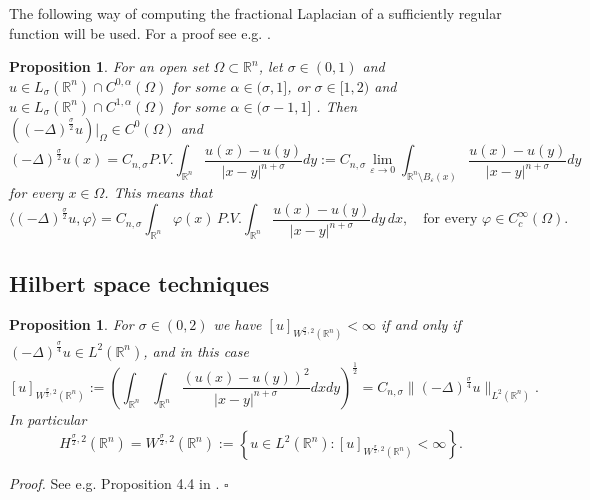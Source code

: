 \documentclass[11pt, a4paper]{article}
\newtheorem{prop}[trm]{Proposition}
\newcommand{\R}{\mathbb{R}}
\newcommand{\ve}{\varepsilon}
\newenvironment{proof}{\noindent\emph{Proof.}}{\phantom{ } \hfill$\square$\medskip}
\begin{document}


The following way of computing the fractional Laplacian of a sufficiently regular function will be used. For a proof see e.g. \cite[Prop. 2.4]{Sil}.


\begin{prop}\label{lapint} For an open set $\Omega\subset\R^n$, let $\sigma\in (0,1)$ and $u\in L_\sigma(\R^n)\cap C^{0,\alpha}(\Omega)$ for some $\alpha\in  (\sigma,1]$, or $\sigma\in [1,2)$ and $u\in L_\sigma(\R^n)\cap C^{1,\alpha}(\Omega)$ for some $\alpha\in  (\sigma-1,1]$ . Then $((-\Delta)^\frac{\sigma}{2} u)|_\Omega\in C^0(\Omega)$ and
$$(-\Delta)^\frac{\sigma}{2} u(x)=C_{n,\sigma} P.V.\int_{\R^n} \frac{u(x)-u(y)}{|x-y|^{n+\sigma}}dy:= C_{n,\sigma}\lim_{\ve\to 0}\int_{\R^n\setminus B_\ve(x)}\frac{u(x)-u(y)}{|x-y|^{n+\sigma}}dy$$
for every $x\in \Omega$. This means that 
$$\langle (-\Delta)^\frac{\sigma}{2} u, \varphi\rangle =C_{n,\sigma}\int_{\R^n} \varphi(x)\,P.V.\int_{\R^n} \frac{u(x)-u(y)}{|x-y|^{n+\sigma}}dy\,dx,\quad \text{for every } \varphi\in C^\infty_c(\Omega).$$
\end{prop}


\subsection{Hilbert space techniques}


\begin{prop}\label{HW}
For $\sigma\in (0,2)$ we have $[u]_{W^{\frac \sigma 2,2}(\R^n)}<\infty$ if and only if $(-\Delta)^\frac{\sigma}{4}u\in L^2(\R^n)$, and in this case
\begin{equation}\label{Wspace}
[u]_{W^{\frac \sigma 2,2}(\R^n)}:=\left(\int_{\R^n}\int_{\R^n}\frac{(u(x)-u(y))^2}{|x-y|^{n+\sigma}}dxdy\right)^\frac12= C_{n,\sigma} \|(-\Delta)^\frac{\sigma}{4}u\|_{L^2(\R^n)}.
\end{equation}
In particular
$$H^{\frac \sigma 2,2}(\R^n)= W^{\frac \sigma 2,2}(\R^n):=\left\{u\in L^2(\R^n):[u]_{W^{\frac \sigma 2,2}(\R^n)}<\infty\right\}.$$
\end{prop}

\begin{proof}
See e.g. Proposition 4.4 in \cite{DNPV}.
\end{proof}
\end{document}
